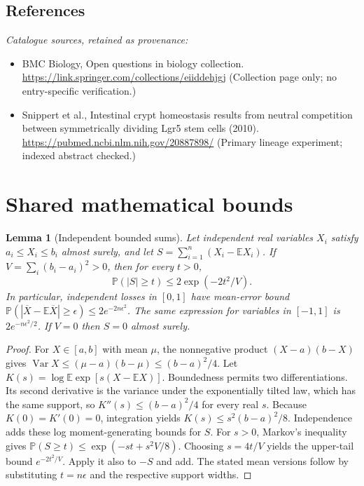 \documentclass[11pt]{article}
\newcommand{\E}{\mathbb E}
\newcommand{\Prob}{\mathbb P}
\DeclareMathOperator{\Var}{Var}
\providecommand{\E}{\mathbb E}
\providecommand{\Prob}{\mathbb P}
\providecommand{\Var}{\operatorname{Var}}
\newtheorem{sharedlemma}{Lemma}[section]
\begin{document}
\subsection{References}
\noindent\emph{Catalogue sources, retained as provenance:}
\begin{itemize}
\item BMC Biology, Open questions in biology collection. \url{https://link.springer.com/collections/eiiddehjgj} (Collection page only; no entry-specific verification.)
\item Snippert et al., Intestinal crypt homeostasis results from neutral competition between symmetrically dividing Lgr5 stem cells (2010). \url{https://pubmed.ncbi.nlm.nih.gov/20887898/} (Primary lineage experiment; indexed abstract checked.)
\end{itemize}
\clearpage


\appendix
\section{Shared mathematical bounds}\label{app:bounds}
\begin{sharedlemma}[Independent bounded sums]\label{lem:bounded}
Let independent real variables $X_i$ satisfy $a_i\leq X_i\leq b_i$ almost surely,
and let $S=\sum_{i=1}^n(X_i-\E X_i)$. If
$V=\sum_i(b_i-a_i)^2>0$, then for every $t>0$,
\[
 \Prob(|S|\geq t)\leq 2\exp(-2t^2/V).
\]
In particular, independent losses in $[0,1]$ have mean-error bound
$\Prob(|\overline X-\E\overline X|\geq\epsilon)
\leq2e^{-2n\epsilon^2}$. The same expression for variables in $[-1,1]$
is $2e^{-n\epsilon^2/2}$. If $V=0$ then $S=0$ almost surely.
\end{sharedlemma}
\begin{proof}
For $X\in[a,b]$ with mean $\mu$, the nonnegative product
$(X-a)(b-X)$ gives
$\Var X\leq(\mu-a)(b-\mu)\leq(b-a)^2/4$.
Let $K(s)=\log\E\exp[s(X-\E X)]$.
Boundedness permits two differentiations. Its second derivative is the variance
under the exponentially tilted law, which has the same support, so
$K''(s)\leq(b-a)^2/4$ for every real $s$.
Because $K(0)=K'(0)=0$, integration yields
$K(s)\leq s^2(b-a)^2/8$.
Independence adds these log moment-generating bounds for $S$.
For $s>0$, Markov's inequality gives
$\Prob(S\geq t)\leq\exp(-st+s^2V/8)$.
Choosing $s=4t/V$ yields the upper-tail bound $e^{-2t^2/V}$.
Apply it also to $-S$ and add. The stated mean versions follow by substituting
$t=n\epsilon$ and the respective support widths.
\end{proof}
\end{document}
